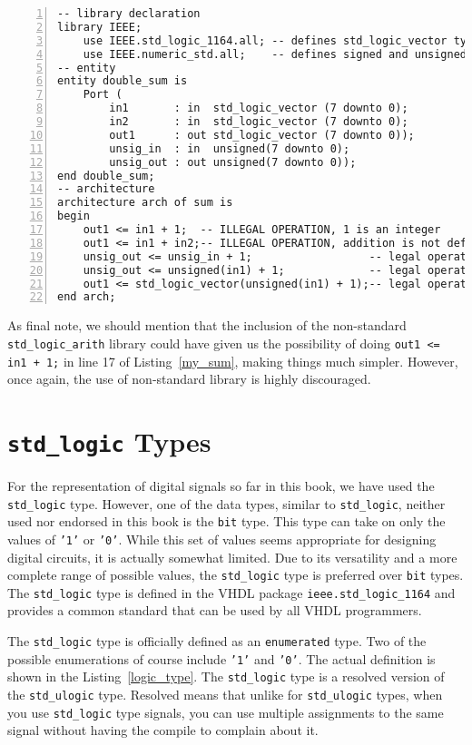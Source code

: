 \noindent
\begin{minipage}{0.99\linewidth}
\begin{lstlisting}[numbers=left, label=my_sum, caption= Use of unsigned types in your code.]
-- library declaration
library IEEE;
    use IEEE.std_logic_1164.all; -- defines std_logic_vector type
    use IEEE.numeric_std.all;    -- defines signed and unsigned types
-- entity
entity double_sum is
    Port (
        in1       : in  std_logic_vector (7 downto 0);
        in2       : in  std_logic_vector (7 downto 0);
        out1      : out std_logic_vector (7 downto 0));
        unsig_in  : in  unsigned(7 downto 0);
        unsig_out : out unsigned(7 downto 0));
end double_sum;
-- architecture
architecture arch of sum is
begin
    out1 <= in1 + 1;  -- ILLEGAL OPERATION, 1 is an integer
    out1 <= in1 + in2;-- ILLEGAL OPERATION, addition is not defined
    unsig_out <= unsig_in + 1;                  -- legal operation
    unsig_out <= unsigned(in1) + 1;             -- legal operation
    out1 <= std_logic_vector(unsigned(in1) + 1);-- legal operation
end arch;
\end{lstlisting}
\end{minipage}

As final note, we should mention that the inclusion of the non-standard \texttt{std\_logic\_arith} library could have given us the possibility of doing \texttt{out1 <= in1 + 1;} in line 17 of Listing~\ref{my_sum}, making things much simpler. However, once again, the use of non-standard library is highly discouraged.

\section{\texttt{std\_logic} Types}
For the representation of digital signals so far in this book, we have used the \texttt{std\_logic} type. However, one of the data types, similar to \texttt{std\_logic}, neither used nor endorsed in this book is the \texttt{bit} type. This type can take on only the values of \texttt{'1'} or \texttt{'0'}. While this set of values seems appropriate for designing digital circuits, it is actually somewhat limited. Due to its versatility and a more complete range of possible values, the \texttt{std\_logic} type is preferred over \texttt{bit} types. The \texttt{std\_logic} type is defined in the VHDL package \texttt{ieee.std\_logic\_1164} and provides a common standard that can be used by all VHDL programmers.

The \texttt{std\_logic} type is officially defined as an \texttt{enumerated} type. Two of the possible enumerations of course include \texttt{'1'} and \texttt{'0'}. The actual definition is shown in the Listing~\ref{logic_type}. The \texttt{std\_logic} type is a resolved version of the \texttt{std\_ulogic} type. Resolved means that unlike for \texttt{std\_ulogic} types, when you use \texttt{std\_logic} type signals, you can use multiple assignments to the same signal without having the compile to complain about it.

